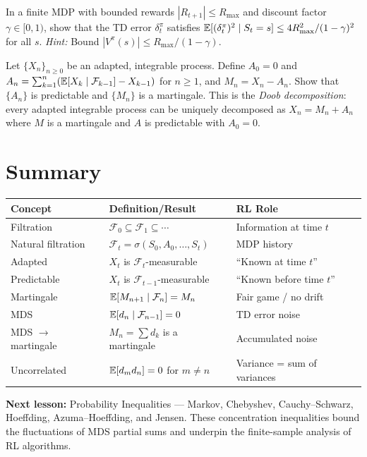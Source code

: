 \documentclass[11pt,a4paper]{article}
\begin{document}
\begin{exercise}
\label{ex:td_error_variance}
In a finite MDP with bounded rewards $|R_{t+1}| \leq R_{\max}$
and discount factor $\gamma \in [0,1)$, show that the TD error
$\delta_t^\pi$ satisfies
$\mathbb{E}[(\delta_t^\pi)^2 \mid S_t = s] \leq 4 R_{\max}^2 / (1-\gamma)^2$
for all $s$.
\textit{Hint:} Bound $|V^\pi(s)| \leq R_{\max}/(1-\gamma)$.
\end{exercise}

\begin{exercise}
\label{ex:doob}
Let $\{X_n\}_{n \geq 0}$ be an adapted, integrable process.
Define $A_0 = 0$ and
$A_n = \sum_{k=1}^n (\mathbb{E}[X_k \mid \mathcal{F}_{k-1}] - X_{k-1})$
for $n \geq 1$, and $M_n = X_n - A_n$.  Show that $\{A_n\}$ is
predictable and $\{M_n\}$ is a martingale.  This is the
\emph{Doob decomposition}: every adapted integrable process can
be uniquely decomposed as $X_n = M_n + A_n$ where $M$ is a
martingale and $A$ is predictable with $A_0 = 0$.
\end{exercise}


\section{Summary}
\label{sec:summary}

\begin{center}
\renewcommand{\arraystretch}{1.4}
\begin{tabular}{p{4cm} p{5.5cm} p{4.5cm}}
\toprule
\textbf{Concept} & \textbf{Definition/Result} &
  \textbf{RL Role} \\
\midrule
Filtration &
  $\mathcal{F}_0 \subseteq \mathcal{F}_1 \subseteq \cdots$ &
  Information at time $t$ \\
Natural filtration &
  $\mathcal{F}_t = \sigma(S_0, A_0, \ldots, S_t)$ &
  MDP history \\
Adapted &
  $X_t$ is $\mathcal{F}_t$-measurable &
  ``Known at time $t$'' \\
Predictable &
  $X_t$ is $\mathcal{F}_{t-1}$-measurable &
  ``Known before time $t$'' \\
Martingale &
  $\mathbb{E}[M_{n+1} \mid \mathcal{F}_n] = M_n$ &
  Fair game / no drift \\
MDS &
  $\mathbb{E}[d_n \mid \mathcal{F}_{n-1}] = 0$ &
  TD error noise \\
MDS $\to$ martingale &
  $M_n = \sum d_k$ is a martingale &
  Accumulated noise \\
Uncorrelated &
  $\mathbb{E}[d_m d_n] = 0$ for $m \neq n$ &
  Variance = sum of variances \\
\bottomrule
\end{tabular}
\end{center}

\medskip
\noindent\textbf{Next lesson:} Probability Inequalities ---
Markov, Chebyshev, Cauchy--Schwarz, Hoeffding, Azuma--Hoeffding,
and Jensen.  These concentration inequalities bound the
fluctuations of MDS partial sums and underpin the finite-sample
analysis of RL algorithms.


\end{document}

